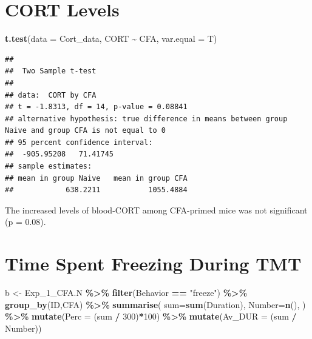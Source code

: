 \documentclass[
]{book}
\newenvironment{Shaded}{\begin{snugshade}}{\end{snugshade}}
\newcommand{\AttributeTok}[1]{\textcolor[rgb]{0.13,0.29,0.53}{#1}}
\newcommand{\DecValTok}[1]{\textcolor[rgb]{0.00,0.00,0.81}{#1}}
\newcommand{\FunctionTok}[1]{\textcolor[rgb]{0.13,0.29,0.53}{\textbf{#1}}}
\newcommand{\NormalTok}[1]{#1}
\newcommand{\OtherTok}[1]{\textcolor[rgb]{0.56,0.35,0.01}{#1}}
\newcommand{\SpecialCharTok}[1]{\textcolor[rgb]{0.81,0.36,0.00}{\textbf{#1}}}
\newcommand{\StringTok}[1]{\textcolor[rgb]{0.31,0.60,0.02}{#1}}
\begin{document}
\section*{CORT Levels}\label{cort-levels-1}

\begin{Shaded}
\begin{Highlighting}[]
\FunctionTok{t.test}\NormalTok{(}\AttributeTok{data =}\NormalTok{ Cort\_data, CORT }\SpecialCharTok{\textasciitilde{}}\NormalTok{ CFA, }\AttributeTok{var.equal =}\NormalTok{ T)}
\end{Highlighting}
\end{Shaded}

\begin{verbatim}
## 
##  Two Sample t-test
## 
## data:  CORT by CFA
## t = -1.8313, df = 14, p-value = 0.08841
## alternative hypothesis: true difference in means between group Naive and group CFA is not equal to 0
## 95 percent confidence interval:
##  -905.95208   71.41745
## sample estimates:
## mean in group Naive   mean in group CFA 
##            638.2211           1055.4884
\end{verbatim}

The increased levels of blood-CORT among CFA-primed mice was not significant (p = 0.08).

\section*{Time Spent Freezing During TMT}\label{time-spent-freezing-during-tmt-2}

\begin{Shaded}
\begin{Highlighting}[]
\NormalTok{b }\OtherTok{\textless{}{-}}\NormalTok{ Exp\_1\_CFA.N  }\SpecialCharTok{\%\textgreater{}\%}
  \FunctionTok{filter}\NormalTok{(Behavior }\SpecialCharTok{==} \StringTok{"freeze"}\NormalTok{) }\SpecialCharTok{\%\textgreater{}\%}
  \FunctionTok{group\_by}\NormalTok{(ID,CFA) }\SpecialCharTok{\%\textgreater{}\%}
  \FunctionTok{summarise}\NormalTok{(}
    \AttributeTok{sum=}\FunctionTok{sum}\NormalTok{(Duration),}
    \AttributeTok{Number=}\FunctionTok{n}\NormalTok{(),}
\NormalTok{  ) }\SpecialCharTok{\%\textgreater{}\%}
  \FunctionTok{mutate}\NormalTok{(}\AttributeTok{Perc =}\NormalTok{ (sum }\SpecialCharTok{/} \DecValTok{300}\NormalTok{)}\SpecialCharTok{*}\DecValTok{100}\NormalTok{) }\SpecialCharTok{\%\textgreater{}\%}
  \FunctionTok{mutate}\NormalTok{(}\AttributeTok{Av\_DUR =}\NormalTok{ (sum }\SpecialCharTok{/}\NormalTok{ Number)) }
\end{Highlighting}
\end{Shaded}
\end{document}

